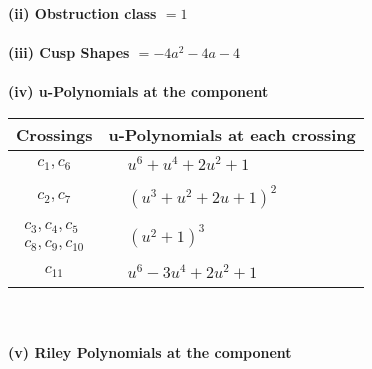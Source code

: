 \documentclass[1p]{elsarticle_modified}
\theoremstyle{definition}
\begin{document}
\flushleft \textbf{(ii) Obstruction class $= 1$}\\~\\
\flushleft \textbf{(iii) Cusp Shapes $= -4 a^2-4 a-4$}\\~\\
\newpage\renewcommand{\arraystretch}{1}
\flushleft \textbf{(iv) u-Polynomials at the component}\newline \\
\begin{tabular}{m{50pt}|m{274pt}}
Crossings & \hspace{64pt}u-Polynomials at each crossing \\
\hline $$\begin{aligned}c_{1},c_{6}\end{aligned}$$&$\begin{aligned}
&u^6+u^4+2 u^2+1
\end{aligned}$\\
\hline $$\begin{aligned}c_{2},c_{7}\end{aligned}$$&$\begin{aligned}
&(u^3+u^2+2 u+1)^2
\end{aligned}$\\
\hline $$\begin{aligned}c_{3},c_{4},c_{5}\\c_{8},c_{9},c_{10}\end{aligned}$$&$\begin{aligned}
&(u^2+1)^3
\end{aligned}$\\
\hline $$\begin{aligned}c_{11}\end{aligned}$$&$\begin{aligned}
&u^6-3 u^4+2 u^2+1
\end{aligned}$\\
\hline
\end{tabular}\\~\\
\newpage\renewcommand{\arraystretch}{1}
\flushleft \textbf{(v) Riley Polynomials at the component}\newline \\
\end{document}
